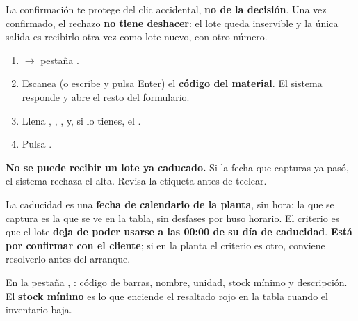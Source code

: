 \begin{cajaOjo}
La confirmación te protege del clic accidental, \textbf{no de la decisión}.
Una vez confirmado, el rechazo \textbf{no tiene deshacer}: el lote queda inservible y
la única salida es recibirlo otra vez como lote nuevo, con otro número.
\end{cajaOjo}

\newpage
{}

\begin{enumerate}
    \item {} $\rightarrow$ pestaña .
    \item Escanea (o escribe y pulsa Enter) el \textbf{código del material}. El sistema
          responde  y abre el resto del formulario.
    \item Llena , , ,
           y, si lo tienes, el .
    \item Pulsa .
\end{enumerate}


\begin{cajaOjo}
\textbf{No se puede recibir un lote ya caducado.} Si la fecha que capturas ya pasó,
el sistema rechaza el alta. Revisa la etiqueta antes de teclear.
\end{cajaOjo}

\begin{cajaInfo}
La caducidad es una \textbf{fecha de calendario de la planta}, sin hora: la que se
captura es la que se ve en la tabla, sin desfases por huso horario. El criterio es que
el lote \textbf{deja de poder usarse a las 00:00 de su día de caducidad}.
\textbf{Está por confirmar con el cliente}; si en la planta el criterio es otro,
conviene resolverlo antes del arranque.
\end{cajaInfo}


En la pestaña , : código de barras, nombre,
unidad, stock mínimo y descripción. El \textbf{stock mínimo} es lo que enciende el
resaltado rojo en la tabla cuando el inventario baja.


